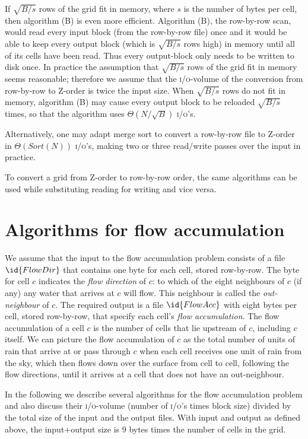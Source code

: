 \documentclass[10pt,a4paper]{article}
\def\io{\textsc{i/o}\xspace}
\def\ios{\textsc{i/o}'s\xspace}
\def\sort{\mathit{Sort}}
\begin{document}
If $\sqrt{B/s}$ rows of the grid fit in memory, where $s$ is the number of bytes per cell, then algorithm (B) is even more efficient. Algorithm (B), the row-by-row scan, would read every input block (from the row-by-row file) once and it would be able to keep every output block (which is $\sqrt{B/s}$ rows high) in memory until all of its cells have been read. Thus every output-block only needs to be written to disk once. In practice the assumption that $\sqrt{B/s}$ rows of the grid fit in memory seems reasonable; therefore we assume that the \io-volume of the conversion from row-by-row to Z-order is twice the input size. When $\sqrt{B/s}$ rows do not fit in memory, algorithm (B) may cause every output block to be reloaded $\sqrt{B/s}$ times, so that the algorithm uses $\Theta(N/\sqrt B)$ \ios.

Alternatively, one may adapt merge sort to convert a row-by-row file to Z-order in $\Theta(\sort(N))$ \ios, making two or three read/write passes over the input in practice.

To convert a grid from Z-order to row-by-row order, the same algorithms can be used while substituting reading for writing and vice versa.

\section{Algorithms for flow accumulation}

We assume that the input to the flow accumulation problem consists of a file $\id{FlowDir}$ that contains one byte for each cell, stored row-by-row. The byte for cell $c$ indicates the \emph{flow direction} of $c$: to which of the eight neighbours of $c$ (if any) any water that arrives at $c$ will flow. This neighbour is called the \emph{out-neighbour} of $c$. The required output is a file $\id{FlowAcc}$ with eight bytes per cell, stored row-by-row, that specify each cell's \emph{flow accumulation}. The flow accumulation of a cell $c$ is the number of cells that lie upstream of $c$, including $c$ itself. We can picture the flow accumulation of $c$ as the total number of units of rain that arrive at or pass through $c$ when each cell receives one unit of rain from the sky, which then flows down over the surface from cell to cell, following the flow directions, until it arrives at a cell that does not have an out-neighbour.

In the following we describe several algorithms for the flow accumulation problem and also discuss their \io-volume (number of \ios times block size) divided by the total size of the input and the output files. With input and output as defined above, the input+output size is 9 bytes times the number of cells in the grid.
\end{document}
